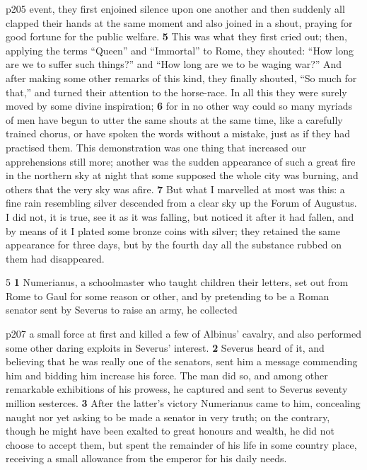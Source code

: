 p205 event, they first enjoined silence upon one another and then suddenly all clapped their hands at the same moment and also joined in a shout, praying for good fortune for the public welfare. \textbf{5} This was what they first cried out; then, applying the terms ``Queen'' and ``Immortal'' to Rome, they shouted: ``How long are we to suffer such things?'' and ``How long are we to be waging war?'' And after making some other remarks of this kind, they finally shouted, ``So much for that,'' and turned their attention to the horse-race. In all this they were surely moved by some divine inspiration; \textbf{6} for in no other way could so many myriads of men have begun to utter the same shouts at the same time, like a carefully trained chorus, or have spoken the words without a mistake, just as if they had practised them. This demonstration was one thing that increased our apprehensions still more; another was the sudden appearance of such a great fire in the northern sky at night that some supposed the whole city was burning, and others that the very sky was afire. \textbf{7} But what I marvelled at most was this: a fine rain resembling silver descended from a clear sky up the Forum of Augustus. I did not, it is true, see it as it was falling, but noticed it after it had fallen, and by means of it I plated some bronze coins with silver; they retained the same appearance for three days, but by the fourth day all the substance rubbed on them had disappeared.

5 \textbf{1} Numerianus, a schoolmaster who taught children their letters, set out from Rome to Gaul for some reason or other, and by pretending to be a Roman senator sent by Severus to raise an army, he collected

p207 a small force at first and killed a few of Albinus' cavalry, and also performed some other daring exploits in Severus' interest. \textbf{2} Severus heard of it, and believing that he was really one of the senators, sent him a message commending him and bidding him increase his force. The man did so, and among other remarkable exhibitions of his prowess, he captured and sent to Severus seventy million sesterces. \textbf{3} After the latter's victory Numerianus came to him, concealing naught nor yet asking to be made a senator in very truth; on the contrary, though he might have been exalted to great honours and wealth, he did not choose to accept them, but spent the remainder of his life in some country place, receiving a small allowance from the emperor for his daily needs.

